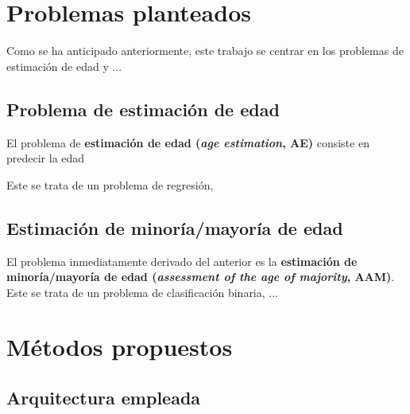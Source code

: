 
\section{Problemas planteados}

Como se ha anticipado anteriormente, este trabajo se centrar en los problemas de estimación de edad y ...


\subsection{Problema de estimación de edad}

El problema de \textbf{estimación de edad (\textit{age estimation}, AE)} consiste en predecir la edad 

Este se trata de un problema de regresión, 



\subsection{Estimación de minoría/mayoría de edad}

El problema inmediatamente derivado del anterior es la 
\textbf{estimación de minoría/mayoría de edad (\textit{assessment of the age of majority}, AAM)}.
Este se trata de un problema de clasificación binaria, ...



\section{Métodos propuestos}

\subsection{Arquitectura empleada}

